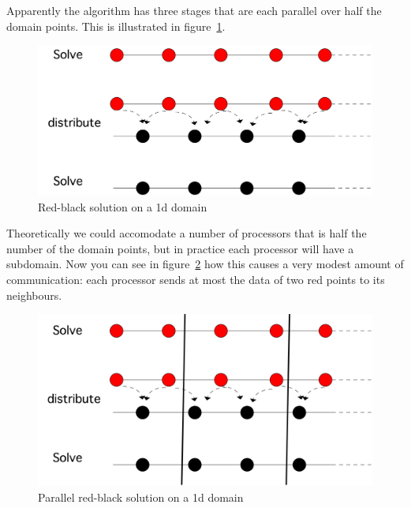 \begin{displayalgorithm}
\end{displayalgorithm}

Apparently the algorithm has three stages that are each parallel over
half the domain points. This is illustrated in
figure~\ref{fig:1d-rb-solve}.
\begin{figure}[ht]
  \includegraphics[scale=.1]{graphics/red-black-1d-solve}
  \caption{Red-black solution on a 1d domain}
  \label{fig:1d-rb-solve}
\end{figure}
Theoretically we could accomodate a number of processors that is half
the number of the domain points, but in practice each processor will
have a subdomain. Now you can see in figure~\ref{fig:1d-rb-solve-par}
how this causes a very modest amount of communication: each processor
sends at most the data of two red points to its neighbours.
\begin{figure}[ht]
  \includegraphics[scale=.1]{graphics/red-black-1d-solve-par}
  \caption{Parallel red-black solution on a 1d domain}
  \label{fig:1d-rb-solve-par}
\end{figure}

